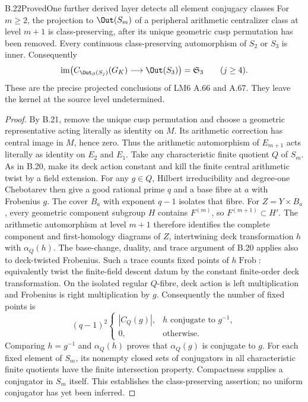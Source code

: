 \begin{statement}{B.22}{Proved}{One further derived layer detects all element conjugacy classes}
For $m\geq2$, the projection to $\Out(S_m)$ of a peripheral
arithmetic centralizer class at level $m+1$ is class-preserving,
after its unique geometric cusp permutation has been removed.
Every continuous class-preserving automorphism of $S_2$ or
$S_3$ is inner. Consequently
\[
 \operatorname{im}\bigl(C_{\Out_{\partial}(S_j)}(G_K)
                 \longrightarrow\Out(S_3)\bigr)
                  =\mathfrak S_3\qquad(j\geq4).
\]
These are the precise projected conclusions of LM6 A.66 and
A.67. They leave the kernel at the source level undetermined.
\end{statement}
\begin{proof}
By B.21, remove the unique cusp permutation and choose a
geometric representative acting literally as identity on $M$.
Its arithmetic correction has central image in $M$, hence zero.
Thus the arithmetic automorphism of $E_{m+1}$ acts literally
as identity on $E_2$ and $E_1$.
Take any characteristic finite quotient $Q$ of $S_m$. As in
B.20, make its deck action constant and kill the finite central
arithmetic twist by a field extension. For any $g\in Q$,
Hilbert irreducibility and degree-one Chebotarev then give a
good rational prime $q$ and a base fibre at $a$ with Frobenius
$g$. The cover $B_a$ with exponent $q-1$ isolates that fibre.
For $Z=Y\times B_a$, every geometric component subgroup
$H$ contains $F^{(m)}$, so $F^{(m+1)}\subset H'$.
The arithmetic automorphism at level $m+1$ therefore identifies
the complete component and first-homology diagrams of $Z$,
intertwining deck transformation $h$ with $\alpha_Q(h)$.
The base-change, duality, and trace argument of B.20 applies
also to deck-twisted Frobenius. Such a trace counts fixed points
of $h\operatorname{Frob}$: equivalently twist the finite-field
descent datum by the constant finite-order deck transformation.
On the isolated regular $Q$-fibre, deck action is left
multiplication and Frobenius is right multiplication by $g$.
Consequently the number of fixed points is
\[
 (q-1)^2
 \begin{cases}|C_Q(g)|,&h\text{ conjugate to }g^{-1},\\
 0,&\text{otherwise}.
 \end{cases}
\]
Comparing $h=g^{-1}$ and $\alpha_Q(h)$ proves that
$\alpha_Q(g)$ is conjugate to $g$. For each fixed element of
$S_m$, its nonempty closed sets of conjugators in all
characteristic finite quotients have the finite intersection
property. Compactness supplies a conjugator in $S_m$ itself.
This establishes the class-preserving assertion; no uniform
conjugator has yet been inferred.


\end{proof}
